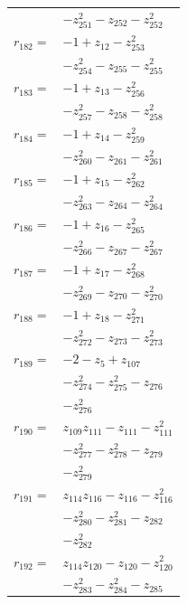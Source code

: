\begin{longtable}{@{}r@{\;}l@{}}
 & \(\displaystyle -z_{251}^{2} -z_{252} -z_{252}^{2}\) \\[3pt]
\(r_{182}=\) & \(\displaystyle -1 +z_{12} -z_{253}^{2}\) \\
 & \(\displaystyle -z_{254}^{2} -z_{255} -z_{255}^{2}\) \\[3pt]
\(r_{183}=\) & \(\displaystyle -1 +z_{13} -z_{256}^{2}\) \\
 & \(\displaystyle -z_{257}^{2} -z_{258} -z_{258}^{2}\) \\[3pt]
\(r_{184}=\) & \(\displaystyle -1 +z_{14} -z_{259}^{2}\) \\
 & \(\displaystyle -z_{260}^{2} -z_{261} -z_{261}^{2}\) \\[3pt]
\(r_{185}=\) & \(\displaystyle -1 +z_{15} -z_{262}^{2}\) \\
 & \(\displaystyle -z_{263}^{2} -z_{264} -z_{264}^{2}\) \\[3pt]
\(r_{186}=\) & \(\displaystyle -1 +z_{16} -z_{265}^{2}\) \\
 & \(\displaystyle -z_{266}^{2} -z_{267} -z_{267}^{2}\) \\[3pt]
\(r_{187}=\) & \(\displaystyle -1 +z_{17} -z_{268}^{2}\) \\
 & \(\displaystyle -z_{269}^{2} -z_{270} -z_{270}^{2}\) \\[3pt]
\(r_{188}=\) & \(\displaystyle -1 +z_{18} -z_{271}^{2}\) \\
 & \(\displaystyle -z_{272}^{2} -z_{273} -z_{273}^{2}\) \\[3pt]
\(r_{189}=\) & \(\displaystyle -2 -z_{5} +z_{107}\) \\
 & \(\displaystyle -z_{274}^{2} -z_{275}^{2} -z_{276}\) \\
 & \(\displaystyle -z_{276}^{2}\) \\[3pt]
\(r_{190}=\) & \(\displaystyle z_{109}z_{111} -z_{111} -z_{111}^{2}\) \\
 & \(\displaystyle -z_{277}^{2} -z_{278}^{2} -z_{279}\) \\
 & \(\displaystyle -z_{279}^{2}\) \\[3pt]
\(r_{191}=\) & \(\displaystyle z_{114}z_{116} -z_{116} -z_{116}^{2}\) \\
 & \(\displaystyle -z_{280}^{2} -z_{281}^{2} -z_{282}\) \\
 & \(\displaystyle -z_{282}^{2}\) \\[3pt]
\(r_{192}=\) & \(\displaystyle z_{114}z_{120} -z_{120} -z_{120}^{2}\) \\
 & \(\displaystyle -z_{283}^{2} -z_{284}^{2} -z_{285}\) \\

\end{longtable}
